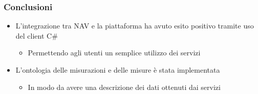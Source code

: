 \documentclass{beamer}
\begin{document}


\begin{frame}
\frametitle{Conclusioni}
\begin{itemize}
\item L'integrazione tra NAV e la piattaforma ha avuto esito positivo tramite uso del client C\# 
\begin{itemize}
\item Permettendo agli utenti un semplice utilizzo dei servizi
\end{itemize}
\item L'ontologia delle misurazioni e delle misure è stata implementata
\begin{itemize}
\item In modo da avere una descrizione dei dati ottenuti dai servizi
\end{itemize}

\end{itemize}	
\end{frame}
\end{document}
